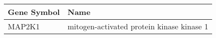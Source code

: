 \begin{tabular}{ll}
\toprule
Gene Symbol &                                      Name \\
\midrule
     MAP2K1 & mitogen-activated protein kinase kinase 1 \\
\bottomrule
\end{tabular}
